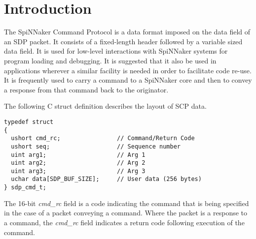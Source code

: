 %
%
%

\def\NoteNum{5}
\def\FullTitle{Spinnaker Command Protocol (SCP) Specification}
\def\ShortTitle{SCP Specification}
\def\Date{16 Mar 2016}
\def\Version{2.0.0}
\def\Author{Steve Temple}
\def\Email{steven.temple@manchester.ac.uk}



\section{Introduction}

The SpiNNaker Command Protocol is a data format imposed on the data
field of an SDP packet. It consists of a fixed-length header followed
by a variable sized data field. It is used for low-level interactions
with SpiNNaker systems for program loading and debugging. It is
suggested that it also be used in applications wherever a similar
facility is needed in order to facilitate code re-use. It is
frequently used to carry a command to a SpiNNaker core and then to
convey a response from that command back to the originator.

The following C struct definition describes the layout of SCP data.

\lstset{language=C}
\begin{lstlisting}
typedef struct
{
  ushort cmd_rc;                // Command/Return Code
  ushort seq;                   // Sequence number
  uint arg1;                    // Arg 1
  uint arg2;                    // Arg 2
  uint arg3;                    // Arg 3
  uchar data[SDP_BUF_SIZE];     // User data (256 bytes)
} sdp_cmd_t;
\end{lstlisting}


The 16-bit {\em cmd\_rc} field is a code indicating the command that
is being specified in the case of a packet conveying a command. Where
the packet is a response to a command, the {\em cmd\_rc} field
indicates a return code following execution of the command.

